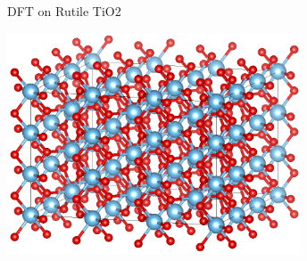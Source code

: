 \documentclass[11pt, xcolor=dvipsnames, aspectratio=43]{beamer}
\begin{document}
\begin{frame}{DFT on Rutile TiO2}{}
\begin{minipage}{0.49\linewidth}
        \centering
        \includegraphics[width=0.65\textwidth]{figures/supercell.png}
    \end{minipage}
\end{frame}
\end{document}
